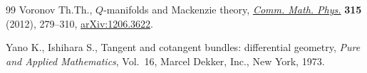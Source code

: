 \documentclass[10pt,a4paper]{amsart}
\numberwithin{equation}{section}
\begin{document}
\begin{thebibliography}{99}
Voronov Th.Th., {$Q$}-manifolds and {M}ackenzie theory, \href{http://dx.doi.org/10.1007/s00220-012-1568-y}{\textit{Comm. Math.
  Phys.}} \textbf{315} (2012), 279--310, \href{http://arxiv.org/abs/1206.3622}{arXiv:1206.3622}.

Yano K., Ishihara S., Tangent and cotangent bundles: dif\/ferential geometry,
  \textit{Pure and Applied Mathematics}, Vol.~16, Marcel Dekker, Inc., New
  York, 1973.

\end{thebibliography}
\end{document}
